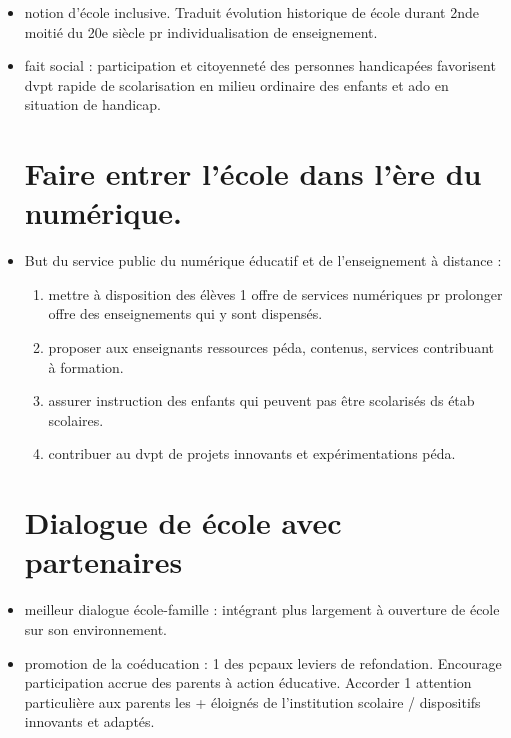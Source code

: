 \documentclass[12pt]{report}
\begin{document}
\begin{itemize}
\item notion d'école inclusive. Traduit évolution historique de école durant 2nde moitié du 20e siècle pr individualisation de enseignement. \\
\item fait social : participation et citoyenneté des personnes handicapées favorisent dvpt rapide de scolarisation en milieu ordinaire des enfants et ado en situation de handicap.\\

\section{Faire entrer l'école dans l'ère du numérique.}

\item But du service public du numérique éducatif et de l'enseignement à distance : 
\begin{enumerate}
\item mettre à disposition des élèves 1 offre de services numériques pr prolonger offre des enseignements qui y sont dispensés. \\
\item proposer aux enseignants ressources péda, contenus, services contribuant à formation. \\
\item assurer instruction des enfants qui peuvent pas être scolarisés ds étab scolaires.\\
\item contribuer au dvpt de projets innovants et expérimentations péda. \\
\end{enumerate}

\section{Dialogue de école avec partenaires}

\item meilleur dialogue école-famille : intégrant plus largement à ouverture de école sur son environnement. \\

\item promotion de la coéducation : 1 des pcpaux leviers de refondation. Encourage participation accrue des parents à action éducative. Accorder 1 attention particulière aux parents les + éloignés de l'institution scolaire / dispositifs innovants et adaptés. \\


\end{itemize}
\end{document}
